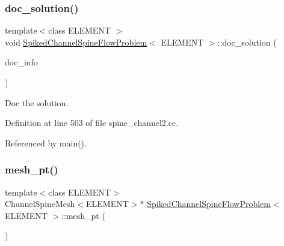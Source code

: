 \mbox{\label{classSpikedChannelSpineFlowProblem_ab9fc5d18831a928a3ad7e2e13efaa6c4}} 
\subsubsection{\texorpdfstring{doc\+\_\+solution()}{doc\_solution()}}
{\footnotesize\ttfamily template$<$class E\+L\+E\+M\+E\+NT $>$ \\
void \hyperlink{classSpikedChannelSpineFlowProblem}{Spiked\+Channel\+Spine\+Flow\+Problem}$<$ E\+L\+E\+M\+E\+NT $>$\+::doc\+\_\+solution (\begin{DoxyParamCaption}\item[{Doc\+Info \&}]{doc\+\_\+info }\end{DoxyParamCaption})}



Doc the solution. 



Definition at line 503 of file spine\+\_\+channel2.\+cc.



Referenced by main().

\mbox{\label{classSpikedChannelSpineFlowProblem_a2125f8744b2e4a8f76a2bafee264db94}} 
\subsubsection{\texorpdfstring{mesh\+\_\+pt()}{mesh\_pt()}}
{\footnotesize\ttfamily template$<$class E\+L\+E\+M\+E\+NT$>$ \\
Channel\+Spine\+Mesh$<$E\+L\+E\+M\+E\+NT$>$$\ast$ \hyperlink{classSpikedChannelSpineFlowProblem}{Spiked\+Channel\+Spine\+Flow\+Problem}$<$ E\+L\+E\+M\+E\+NT $>$\+::mesh\+\_\+pt (\begin{DoxyParamCaption}{ }\end{DoxyParamCaption})\hspace{0.3cm}{\ttfamily [inline]}}



